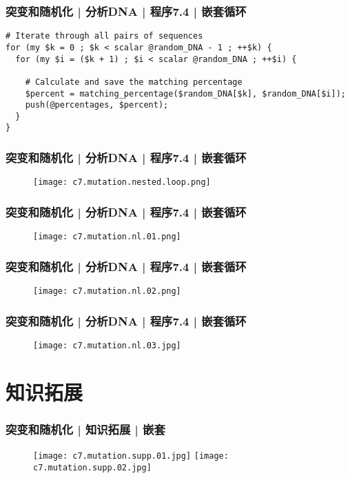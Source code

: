 \begin{frame}[fragile]
  \frametitle{突变和随机化 | 分析DNA | 程序7.4 | \alert{嵌套循环}}
\begin{lstlisting}
# Iterate through all pairs of sequences
for (my $k = 0 ; $k < scalar @random_DNA - 1 ; ++$k) {
  for (my $i = ($k + 1) ; $i < scalar @random_DNA ; ++$i) {

    # Calculate and save the matching percentage
    $percent = matching_percentage($random_DNA[$k], $random_DNA[$i]);
    push(@percentages, $percent);
  }
}
\end{lstlisting}
\end{frame}

\begin{frame}
  \frametitle{突变和随机化 | 分析DNA | 程序7.4 | 嵌套循环}
  \begin{figure}
    \centering
    \texttt{[image: c7.mutation.nested.loop.png]}
  \end{figure}
\end{frame}

\begin{frame}
  \frametitle{突变和随机化 | 分析DNA | 程序7.4 | 嵌套循环}
  \begin{figure}
    \centering
    \texttt{[image: c7.mutation.nl.01.png]}
  \end{figure}
\end{frame}

\begin{frame}
  \frametitle{突变和随机化 | 分析DNA | 程序7.4 | 嵌套循环}
  \begin{figure}
    \centering
    \texttt{[image: c7.mutation.nl.02.png]}
  \end{figure}
\end{frame}

\begin{frame}
  \frametitle{突变和随机化 | 分析DNA | 程序7.4 | 嵌套循环}
  \begin{figure}
    \centering
    \texttt{[image: c7.mutation.nl.03.jpg]}
  \end{figure}
\end{frame}

\section{知识拓展}
\begin{frame}
  \frametitle{突变和随机化 | 知识拓展 | 嵌套}
  \begin{figure}
    \centering
    \texttt{[image: c7.mutation.supp.01.jpg]}\quad
    \texttt{[image: c7.mutation.supp.02.jpg]}
  \end{figure}
\end{frame}

